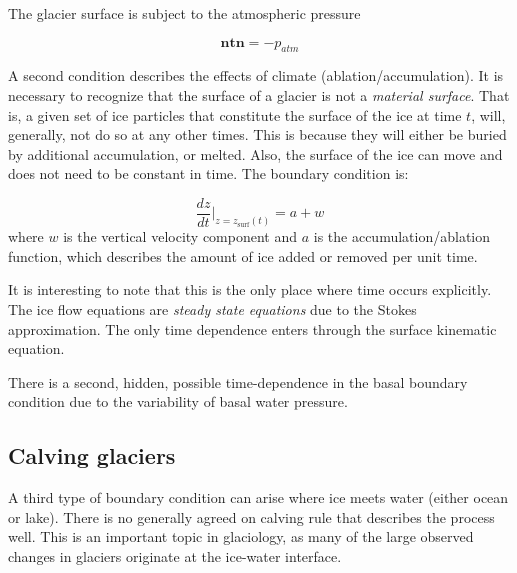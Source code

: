 \documentclass[12pt, openany]{memoir}
\begin{document}
The glacier surface is subject to the atmospheric pressure

\begin{equation}
\mathbf{n} \mathbf{t} \mathbf{n} = -p_{atm}
\end{equation}

A second condition describes the effects of climate
(ablation/accumulation). It is necessary to recognize that the surface
of a glacier is not a \emph{material surface}. That is, a given set of
ice particles that constitute the surface of the ice at time $t$,
will, generally, not do so at any other times. This is because they
will either be buried by additional accumulation, or melted. Also, the
surface of the ice can move and does not need to be constant in
time. The boundary condition is:

\begin{equation}
\frac{dz}{dt}|_{z=z_\mathrm{surf}(t)} = a + w
\end{equation}
where $w$ is the vertical velocity component and $a$ is the
accumulation/ablation function, which describes the amount of ice
added or removed per unit time.

It is interesting to note that this is the only place where time
occurs explicitly. The ice flow equations are \emph{steady state
  equations} due to the Stokes approximation. The only time dependence
enters through the surface kinematic equation.

There is a second, hidden, possible time-dependence in the basal
boundary condition due to the variability of basal water pressure.

\subsection{Calving glaciers}

A third type of boundary condition can arise where ice meets water
(either ocean or lake). There is no generally agreed on calving rule
that describes the process well. This is an important topic in
glaciology, as many of the large observed changes in glaciers
originate at the ice-water interface.
\end{document}
